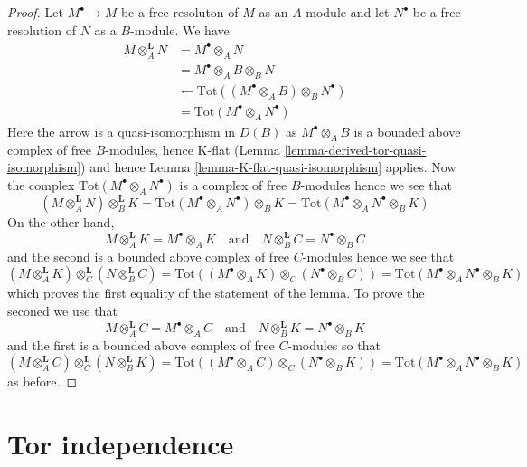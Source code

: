 \begin{proof}
Let $M^\bullet \to M$ be a free resoluton of $M$ as an $A$-module
and let $N^\bullet$ be a free resolution of $N$ as a $B$-module.
We have
\begin{align*}
M \otimes_A^\mathbf{L} N
& =
M^\bullet \otimes_A N \\
& =
M^\bullet \otimes_A B \otimes_B N \\
& \leftarrow
\text{Tot}((M^\bullet \otimes_A B) \otimes_B N^\bullet) \\
& = \text{Tot}(M^\bullet \otimes_A N^\bullet)
\end{align*}
Here the arrow is a quasi-isomorphism in $D(B)$ as $M^\bullet \otimes_A B$
is a bounded above complex of free $B$-modules, hence K-flat
(Lemma \ref{lemma-derived-tor-quasi-isomorphism})
and hence Lemma \ref{lemma-K-flat-quasi-isomorphism} applies.
Now the complex $\text{Tot}(M^\bullet \otimes_A N^\bullet)$ is a
complex of free $B$-modules hence we see that
$$
(M \otimes_A^\mathbf{L} N) \otimes_B^\mathbf{L} K =
\text{Tot}(M^\bullet \otimes_A N^\bullet) \otimes_B K =
\text{Tot}(M^\bullet \otimes_A N^\bullet \otimes_B K)
$$
On the other hand,
$$
M \otimes_A^\mathbf{L} K = M^\bullet \otimes_A K
\quad\text{and}\quad
N \otimes_B^\mathbf{L} C = N^\bullet \otimes_B C
$$
and the second is a bounded above
complex of free $C$-modules hence we see that
$$
(M \otimes_A^\mathbf{L} K) \otimes_C^\mathbf{L} (N \otimes_B^\mathbf{L} C) =
\text{Tot}((M^\bullet \otimes_A K) \otimes_C (N^\bullet \otimes_B C)) =
\text{Tot}(M^\bullet \otimes_A N^\bullet \otimes_B K)
$$
which proves the first equality of the statement of the lemma.
To prove the seconed we use that
$$
M \otimes_A^\mathbf{L} C = M^\bullet \otimes_A C
\quad\text{and}\quad
N \otimes_B^\mathbf{L} K = N^\bullet \otimes_B K
$$
and the first is a bounded above complex of free $C$-modules so that
$$
(M \otimes_A^\mathbf{L} C) \otimes_C^\mathbf{L} (N \otimes_B^\mathbf{L} K) =
\text{Tot}((M^\bullet \otimes_A C) \otimes_C (N^\bullet \otimes_B K)) =
\text{Tot}(M^\bullet \otimes_A N^\bullet \otimes_B K)
$$
as before.
\end{proof}






\section{Tor independence}
\label{section-tor-independece}

